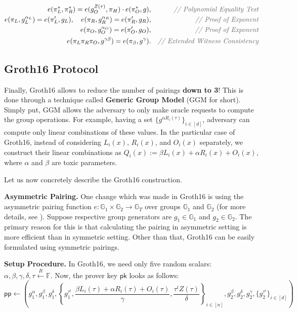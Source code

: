 \documentclass[../lecture-notes.tex]{subfiles}
\begin{document}
\begin{tcolorbox}
\begin{itemize}[label=]
    \end{itemize}
    \begin{align*}
        e(\pi_L^*, \pi_R^*) = e(g_O^{Z(\tau)}, \pi_H)\cdot e(\pi_O^*, g),&& \textcolor{gray!80!black}{\textit{// Polynomial Equality Test}} \\
        e(\pi_L, g_L^{\alpha_L}) = e(\pi_L', g_L), \quad e(\pi_R, g_R^{\alpha_R}) = e(\pi_R', g_R),&& \textcolor{gray!80!black}{\textit{// Proof of Exponent}} \\
        e(\pi_O, g_O^{\alpha_O}) = e(\pi_O', g_O),&& \textcolor{gray!80!black}{\textit{// Proof of Exponent}} \\
        e(\pi_L\pi_R\pi_O, g^{\gamma\beta}) = e(\pi_{\beta}, g^{\gamma}).&& \textcolor{gray!80!black}{\textit{// Extended Witness Consistency}}
    \end{align*}
\end{tcolorbox}

\subsection{Groth16 Protocol}

Finally, Groth16 allows to reduce the number of pairings \textbf{down to 3}! This is done through a technique called \textbf{Generic Group Model} (GGM for short). Simply put, GGM allows the adversary to only make oracle requests to compute the group operations. For example, having a set $\{g^{\alpha R_i(\tau)}\}_{i \in [d]}$, adversary can compute only linear combinations of these values. In the particular case of Groth16, instead of considering $L_i(x)$, $R_i(x)$, and $O_i(x)$ separately, we construct their linear combinations as $Q_i(x) := \beta L_i(x) + \alpha R_i(x) + O_i(x)$, where $\alpha$ and $\beta$ are toxic parameters.

Let us now concretely describe the Groth16 construction.

\textcolor{gray!75!black}{\textbf{Asymmetric Pairing.}} One change which was made in Groth16 is using the asymmetric pairing function $e: \mathbb{G}_1 \times \mathbb{G}_2 \to \mathbb{G}_T$ over groups $\mathbb{G}_1$ and $\mathbb{G}_2$ (for more details, see ). Suppose respective group generators are $g_1 \in \mathbb{G}_1$ and $g_2 \in \mathbb{G}_2$. The primary reason for this is that calculating the pairing in asymmetric setting is more efficient than in symmetric setting. Other than that, Groth16 can be easily formulated using symmetric pairings.

\textcolor{blue!75!gray}{\textbf{Setup Procedure.}} In Groth16, we need only five random scalars: $\alpha,\beta,\gamma,\delta,\tau \xleftarrow{R} \mathbb{F}$. Now, the prover key $\mathsf{pk}$ looks as follows:
\begin{equation*}
    \mathsf{pp} \gets \left(g_1^{\alpha},g_1^{\beta},g_1^{\delta},\left\{g_1^{\tau^i},\frac{\beta L_i(\tau) + \alpha R_i(\tau) + O_i(\tau)}{\gamma}, \frac{\tau^i Z(\tau)}{\delta}\right\}_{i \in [n]},g_2^{\beta}, g_2^{\delta}, g_2^{\gamma}, \{g_2^{\tau^i}\}_{i \in [d]}\right)
\end{equation*}
\end{document}
